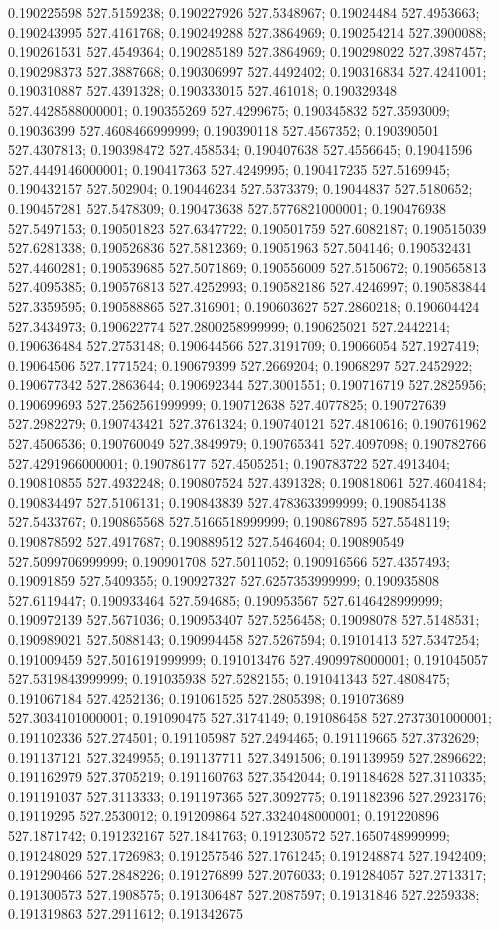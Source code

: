 0.190225598 527.5159238; 0.190227926 527.5348967; 0.19024484 527.4953663; 0.190243995 527.4161768; 0.190249288 527.3864969; 0.190254214 527.3900088; 0.190261531 527.4549364; 0.190285189 527.3864969; 0.190298022 527.3987457; 0.190298373 527.3887668; 0.190306997 527.4492402; 0.190316834 527.4241001; 0.190310887 527.4391328; 0.190333015 527.461018; 0.190329348 527.4428588000001; 0.190355269 527.4299675; 0.190345832 527.3593009; 0.19036399 527.4608466999999; 0.190390118 527.4567352; 0.190390501 527.4307813; 0.190398472 527.458534; 0.190407638 527.4556645; 0.19041596 527.4449146000001; 0.190417363 527.4249995; 0.190417235 527.5169945; 0.190432157 527.502904; 0.190446234 527.5373379; 0.19044837 527.5180652; 0.190457281 527.5478309; 0.190473638 527.5776821000001; 0.190476938 527.5497153; 0.190501823 527.6347722; 0.190501759 527.6082187; 0.190515039 527.6281338; 0.190526836 527.5812369; 0.19051963 527.504146; 0.190532431 527.4460281; 0.190539685 527.5071869; 0.190556009 527.5150672; 0.190565813 527.4095385; 0.190576813 527.4252993; 0.190582186 527.4246997; 0.190583844 527.3359595; 0.190588865 527.316901; 0.190603627 527.2860218; 0.190604424 527.3434973; 0.190622774 527.2800258999999; 0.190625021 527.2442214; 0.190636484 527.2753148; 0.190644566 527.3191709; 0.19066054 527.1927419; 0.19064506 527.1771524; 0.190679399 527.2669204; 0.19068297 527.2452922; 0.190677342 527.2863644; 0.190692344 527.3001551; 0.190716719 527.2825956; 0.190699693 527.2562561999999; 0.190712638 527.4077825; 0.190727639 527.2982279; 0.190743421 527.3761324; 0.190740121 527.4810616; 0.190761962 527.4506536; 0.190760049 527.3849979; 0.190765341 527.4097098; 0.190782766 527.4291966000001; 0.190786177 527.4505251; 0.190783722 527.4913404; 0.190810855 527.4932248; 0.190807524 527.4391328; 0.190818061 527.4604184; 0.190834497 527.5106131; 0.190843839 527.4783633999999; 0.190854138 527.5433767; 0.190865568 527.5166518999999; 0.190867895 527.5548119; 0.190878592 527.4917687; 0.190889512 527.5464604; 0.190890549 527.5099706999999; 0.190901708 527.5011052; 0.190916566 527.4357493; 0.19091859 527.5409355; 0.190927327 527.6257353999999; 0.190935808 527.6119447; 0.190933464 527.594685; 0.190953567 527.6146428999999; 0.190972139 527.5671036; 0.190953407 527.5256458; 0.19098078 527.5148531; 0.190989021 527.5088143; 0.190994458 527.5267594; 0.19101413 527.5347254; 0.191009459 527.5016191999999; 0.191013476 527.4909978000001; 0.191045057 527.5319843999999; 0.191035938 527.5282155; 0.191041343 527.4808475; 0.191067184 527.4252136; 0.191061525 527.2805398; 0.191073689 527.3034101000001; 0.191090475 527.3174149; 0.191086458 527.2737301000001; 0.191102336 527.274501; 0.191105987 527.2494465; 0.191119665 527.3732629; 0.191137121 527.3249955; 0.191137711 527.3491506; 0.191139959 527.2896622; 0.191162979 527.3705219; 0.191160763 527.3542044; 0.191184628 527.3110335; 0.191191037 527.3113333; 0.191197365 527.3092775; 0.191182396 527.2923176; 0.19119295 527.2530012; 0.191209864 527.3324048000001; 0.191220896 527.1871742; 0.191232167 527.1841763; 0.191230572 527.1650748999999; 0.191248029 527.1726983; 0.191257546 527.1761245; 0.191248874 527.1942409; 0.191290466 527.2848226; 0.191276899 527.2076033; 0.191284057 527.2713317; 0.191300573 527.1908575; 0.191306487 527.2087597; 0.19131846 527.2259338; 0.191319863 527.2911612; 0.191342675 